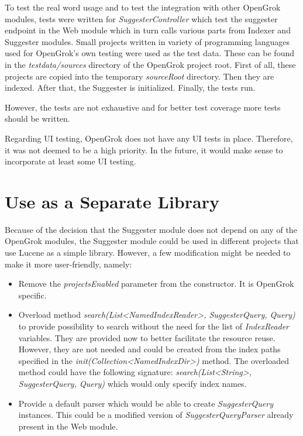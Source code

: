 To test the real word usage and to test the integration with other OpenGrok modules,
tests were written for \textit{SuggesterController} which test the
suggester endpoint in the Web module which in turn calls various parts from Indexer and Suggester modules.
Small projects written in variety of programming languages used for OpenGrok's own testing were used as the test data.
These can be found in the \textit{testdata/sources} directory of the OpenGrok project root.
First of all, these projects are copied into the temporary \textit{sourceRoot} directory. Then they are indexed.
After that, the Suggester is initialized. Finally, the tests run.

However, the tests are not exhaustive and for better test coverage more tests should be written.

Regarding UI testing, OpenGrok does not have any UI tests in place. Therefore, it was not deemed to be a high priority.
In the future, it would make sense to incorporate at least some UI testing.

\section{Use as a Separate Library}
Because of the decision that the Suggester module does not depend on any of the OpenGrok modules, the Suggester module
could be used in different projects that use Lucene as a simple library.
However, a few modification might be needed to make it more user-friendly,
namely:
\begin{itemize}
    \item Remove the \textit{projectsEnabled} parameter from the constructor. It is OpenGrok specific.
    \item Overload method \textit{search(List\textless NamedIndexReader\textgreater, SuggesterQuery, Query)} to provide
    possibility to search without the need for the list of \textit{IndexReader} variables. They are provided now to better
    facilitate the resource reuse. However, they are not needed and could be created from the index paths specified in
    the \textit{init(Collection\textless NamedIndexDir\textgreater)} method. The overloaded method could have the following signature:
    \textit{search(List\textless String\textgreater, SuggesterQuery, Query)} which would only specify index names.
    \item Provide a default parser which would be able to create \textit{SuggesterQuery} instances. This could be a
    modified version of \textit{SuggesterQueryParser} already present in the Web module.
\end{itemize}
